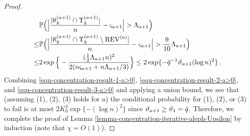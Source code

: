 \documentclass[11pt]{article}
\numberwithin{equation}{section}
\begin{document}
\begin{proof}
\begin{align}
    & \mathbb{P} \Big(\Big| \frac{|\aleph^{(a+1)}_k \cap \Upsilon^{(a+1)}_k|}{n} - \varsigma_{a+1} \Big| > \Lambda_{a+1} \Big) \nonumber \\
    \leq & \mathbb{P} \Big( \Big| \frac{|\aleph^{(a+1)}_k \cap \Upsilon^{(a+1)}_k \setminus \mathrm{REV}^{(a)}|}{n} - \varsigma_{a+1} \Big| > \frac{9}{10} \Lambda_{a+1} \Big) \nonumber \\
    \leq & 2 \exp \Big\{ - \frac{ (\frac{1}{2} \Lambda_{a+1} n)^2 }{ 2(n \varsigma_{a+1} + n \Lambda_{a+1}/3 )}  \Big\} \leq 2 \exp \{ - \Hat{q}^{-1} \vartheta_{a+1} (\log n)^2 \} \,.
    \label{equ-concentration-result-3-a>0}
\end{align}
Combining \eqref{equ-concentration-result-1-a>0}, \eqref{equ-concentration-result-2-a>0}, and \eqref{equ-concentration-result-3-a>0} and applying a union bound, we see that (assuming (1), (2), (3) holds for $a$) the conditional probability for (1), (2), or (3) to fail is at most $2K_0^2 \exp\{ - (\log n)^2 \}$ since $\vartheta_{a+1} \geq \vartheta_{1} = \Hat{q}$. Therefore, we complete the proof of Lemma \ref{lemma-concentration-iterative-aleph-Upsilon} by induction (note that $\chi = O(1)$).
\end{proof}
\end{document}
